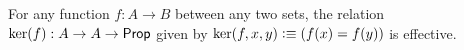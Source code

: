 \documentclass[hott-all.tex]{subfiles}
\begin{document}
% 
% 
% 
% 
\begin{thm}
For any function $f:A\to B$ between any two sets,
the relation $\ker(f):A\to A\to\mathsf{Prop}$ given by
$\ker(f,x,y)\vcentcolon\equiv (f(x)= f(y))$ is effective.
\end{thm}
% 
\end{document}
